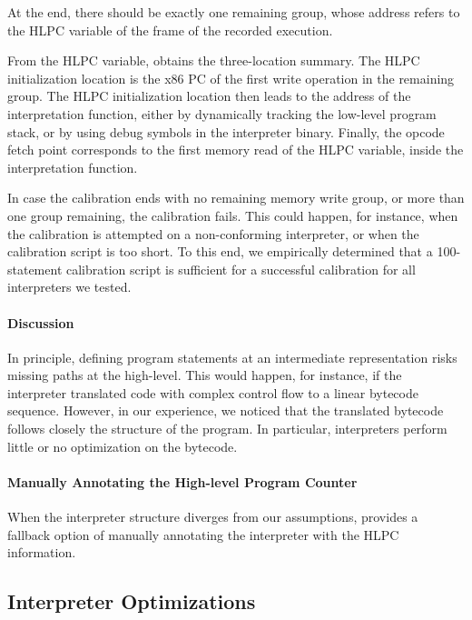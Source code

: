 At the end, there should be exactly one remaining group, whose address refers to the HLPC variable of the frame of the recorded execution.

From the HLPC variable, \chef obtains the three-location summary.
%
The HLPC initialization location is the x86 PC of the first write operation in the remaining group.
%
The HLPC initialization location then leads to the address of the interpretation function, either by dynamically tracking the low-level program stack, or by using debug symbols in the interpreter binary.
%
Finally, the opcode fetch point corresponds to the first memory read of the HLPC variable, inside the interpretation function.

In case the calibration ends with no remaining memory write group, or more than one group remaining, the calibration fails.
%
This could happen, for instance, when the calibration is attempted on a non-conforming interpreter, or when the calibration script is too short.  To this end, we empirically determined that a 100-statement calibration script is sufficient for a successful calibration for all interpreters we tested.

\paragraph{Discussion}

In principle, defining program statements at an intermediate representation risks missing paths at the high-level.
%
This would happen, for instance, if the interpreter translated code with complex control flow to a linear bytecode sequence.
%
However, in our experience, we noticed that the translated bytecode follows closely the structure of the program.
%
In particular, interpreters perform little or no optimization on the bytecode.

\paragraph{Manually Annotating the High-level Program Counter}

When the interpreter structure diverges from our assumptions, \chef provides a fallback option of manually annotating the interpreter with the HLPC information.

\subsection{Interpreter Optimizations}
\label{sec:chef:optimzeforsymbex}

